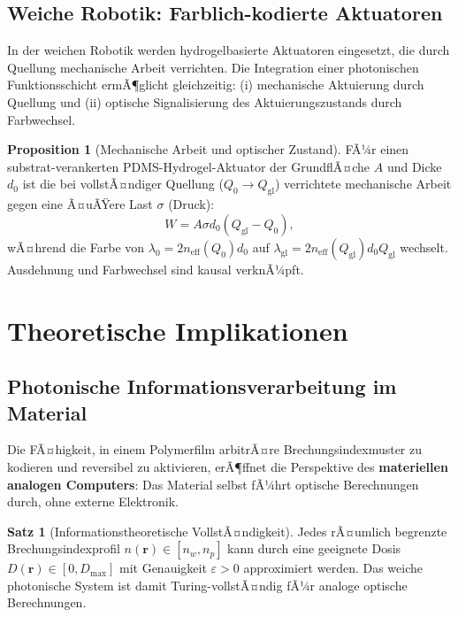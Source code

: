 ﻿\documentclass[a4paper,12pt]{article}
\theoremstyle{definition}
\newtheorem{satz}{Satz}[section]
\newtheorem{proposition}{Proposition}[section]
\newcommand{\neff}{n_\mathrm{eff}}
\newcommand{\vect}[1]{\bm{#1}}
\begin{document}
	\subsection{Weiche Robotik: Farblich-kodierte Aktuatoren}
	
	In der weichen Robotik werden hydrogelbasierte Aktuatoren eingesetzt,
	die durch Quellung mechanische Arbeit verrichten. Die Integration einer
	photonischen Funktionsschicht ermÃ¶glicht gleichzeitig:
	(i) mechanische Aktuierung durch Quellung und
	(ii) optische Signalisierung des Aktuierungszustands durch Farbwechsel.
	
	\begin{proposition}[Mechanische Arbeit und optischer Zustand]
		\label{prop:aktuator}
		FÃ¼r einen substrat-verankerten PDMS-Hydrogel-Aktuator der GrundflÃ¤che $A$
		und Dicke $d_0$ ist die bei vollstÃ¤ndiger Quellung ($Q_0 \to Q_\mathrm{gl}$)
		verrichtete mechanische Arbeit gegen eine Ã¤uÃŸere Last $\sigma$ (Druck):
		\begin{equation}
			W = A \sigma d_0 (Q_\mathrm{gl} - Q_0),
			\label{eq:arbeit}
		\end{equation}
		wÃ¤hrend die Farbe von $\lambda_0 = 2\neff(Q_0)d_0$ auf
		$\lambda_\mathrm{gl} = 2\neff(Q_\mathrm{gl})d_0 Q_\mathrm{gl}$
		wechselt. Ausdehnung und Farbwechsel sind kausal verknÃ¼pft.
	\end{proposition}
	
	\section{Theoretische Implikationen}
	\label{sec:implikationen}
	
	\subsection{Photonische Informationsverarbeitung im Material}
	
	Die FÃ¤higkeit, in einem Polymerfilm arbitrÃ¤re Brechungsindexmuster zu
	kodieren und reversibel zu aktivieren, erÃ¶ffnet die Perspektive des
	\textbf{materiellen analogen Computers}: Das Material selbst fÃ¼hrt optische
	Berechnungen durch, ohne externe Elektronik.
	
	\begin{satz}[Informationstheoretische VollstÃ¤ndigkeit]
		\label{satz:vollstaendigkeit}
		Jedes rÃ¤umlich begrenzte Brechungsindexprofil $n(\vect{r}) \in [n_w, n_p]$
		kann durch eine geeignete Dosis $D(\vect{r}) \in [0, D_\mathrm{max}]$
		mit Genauigkeit $\varepsilon > 0$ approximiert werden. Das weiche photonische
		System ist damit Turing-vollstÃ¤ndig fÃ¼r analoge optische Berechnungen.
	\end{satz}
	
\end{document}
